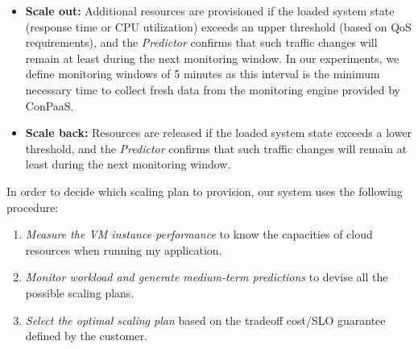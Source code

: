\begin{itemize}

\item \textbf{Scale out:} Additional resources are provisioned if the loaded system state (response time or CPU utilization) exceeds an upper threshold (based on QoS requirements), and the \emph{Predictor} confirms that such traffic changes will remain at least during the next monitoring window. In our experiments, we define monitoring windows of 5 minutes as this interval is the minimum necessary time to collect fresh data from the monitoring engine provided by ConPaaS. 

\item \textbf{Scale back:} Resources are released if the loaded system state exceeds a lower threshold, and the \emph{Predictor} confirms that such traffic changes will remain at least during the next monitoring window.

\end{itemize}

In order to decide which scaling plan to provision, our system uses the following procedure:
\begin{enumerate}
\item \emph{Measure the VM instance performance} to know the capacities of cloud resources when running my application.
\item \emph{Monitor workload and generate medium-term predictions} to devise all the possible scaling plans.
\item \emph{Select the optimal scaling plan} based on the tradeoff cost/SLO guarantee defined by the customer.
\end{enumerate}




